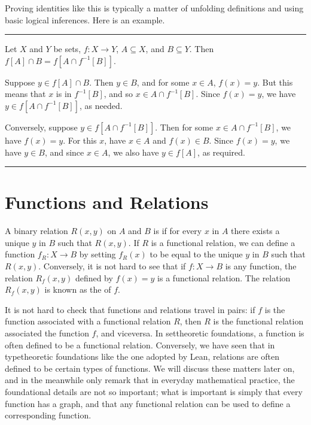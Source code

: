 \documentclass[letterpaper,10pt,english]{sphinxmanual}
\begin{document}
\sphinxAtStartPar
Proving identities like this is typically a matter of unfolding definitions and using basic logical inferences. Here is an example.


\bigskip\hrule\bigskip


\sphinxAtStartPar
{} Let \(X\) and \(Y\) be sets, \(f : X \to Y\), \(A \subseteq X\), and \(B \subseteq Y\). Then \(f[A] \cap B = f[A \cap f^{-1}[B]]\).

\sphinxAtStartPar
{} Suppose \(y \in f[A] \cap B\). Then \(y \in B\), and for some \(x \in A\), \(f(x) = y\). But this means that \(x\) is in \(f^{-1}[B]\), and so \(x \in A \cap f^{-1}[B]\). Since \(f(x) = y\), we have \(y \in f[A \cap f^{-1}[B]]\), as needed.

\sphinxAtStartPar
Conversely, suppose \(y \in f[A \cap f^{-1}[B]]\). Then for some \(x \in A \cap f^{-1}[B]\), we have \(f(x) = y\). For this \(x\), have \(x \in A\) and \(f(x) \in B\). Since \(f(x) = y\), we have \(y \in B\), and since \(x \in A\), we also have \(y \in f[A]\), as required.


\bigskip\hrule\bigskip



\section{Functions and Relations}
\label{\detokenize{functions:functions-and-relations}}\label{\detokenize{functions:id3}}
\sphinxAtStartPar
A binary relation \(R(x,y)\) on \(A\) and \(B\) is  if for every \(x\) in \(A\) there exists a unique \(y\) in \(B\) such that \(R(x,y)\). If \(R\) is a functional relation, we can define a function \(f_R : X \to B\) by setting \(f_R(x)\) to be equal to the unique \(y\) in \(B\) such that \(R(x,y)\). Conversely, it is not hard to see that if \(f : X \to B\) is any function, the relation \(R_f(x, y)\) defined by \(f(x) = y\) is a functional relation. The relation \(R_f(x,y)\) is known as the  of \(f\).

\sphinxAtStartPar
It is not hard to check that functions and relations travel in pairs: if \(f\) is the function associated with a functional relation \(R\), then \(R\) is the functional relation associated the function \(f\), and vice\sphinxhyphen{}versa. In set\sphinxhyphen{}theoretic foundations, a function is often defined to be a functional relation. Conversely, we have seen that in type\sphinxhyphen{}theoretic foundations like the one adopted by Lean, relations are often defined to be certain types of functions. We will discuss these matters later on, and in the meanwhile only remark that in everyday mathematical practice, the foundational details are not so important; what is important is simply that every function has a graph, and that any functional relation can be used to define a corresponding function.
\end{document}
